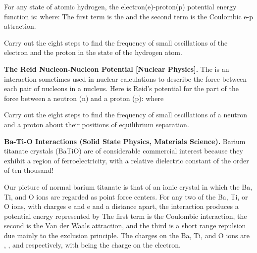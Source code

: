 {\begin{one-digit-list}
For any  state of atomic hydrogen, the electron(e)-proton(p) potential
energy function is:
%
%
where:
%
%
%
%
%
The first term is the  and the
second term is the Coulombic e-p attraction.

Carry out the eight steps to find the frequency of small oscillations of the
electron and the proton in the  state of the hydrogen atom.

\item [7.] {\bf The Reid Nucleon-Nucleon Potential [Nuclear Physics].}
The  is an interaction sometimes used in nuclear
calculations to describe the force between each pair of nucleons in a nucleus.
Here is Reid's potential for the  part of the force between a
neutron (n) and a proton (p):
%
%
%
where
%
%
%
%
%
%

Carry out the eight steps to find the frequency of small oscillations of a
neutron and a proton about their positions of equilibrium separation.

\item [8.] {\bf Ba-Ti-O  Interactions (Solid State Physics,
Materials Science).}
Barium titanate crystals (BaTiO) are of considerable commercial interest
because they exhibit a region of ferroelectricity, with a relative dielectric
constant of the order of ten thousand!

Our picture of normal barium titanate is that of an ionic crystal in which
the Ba, Ti, and O ions are regarded as point force centers.
For any two of the Ba, Ti, or O ions, with charges e and e and a
distance  apart, the interaction produces a potential energy represented by
%
%
%
The first term is the Coulombic interaction, the second is the Van der Waals
attraction, and the third is a short range repulsion due mainly to the
exclusion principle.
The charges on the Ba, Ti, and O ions are , , and  respectively,
with  being the charge on the electron.


\end{one-digit-list}}
